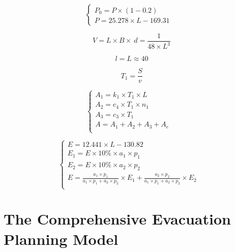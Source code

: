 \documentclass{mcmthesis}
\begin{document}
\begin{equation}
\left\{
\begin{array}{lr}
P_0=P \times (1-0.2) &\\
P=25.278\times L -169.31
\end{array}
\right.
\end{equation}



\begin{equation}\label{3}
V=L\times B\times\ d =\frac{1}{48\times L^3}
\end{equation}

\begin{equation}\label{4}
l=L\approx 40
\end{equation}

\begin{equation}\label{4}
T_1=\frac{S}{v}
\end{equation}


			\begin{equation}
			\left\{
			\begin{array}{lr}

A_1=k_1 \times T_1\times L  &\\
A_2=c_4  \times T_1 \times n_1 &\\
A_3=c_3  \times T_1 &\\
A=A_1+A_2+A_3+A_e \\		
			\end{array}
			\right.
			\end{equation}



\begin{equation}
\left\{
\begin{array}{lr}
E=12.441\times L -130.82&\\
E_1=E \times 10\% \times a_1 \times p_1 &\\
E_2=E\times 10\% \times a_2 \times p_2 &\\
E= \frac{a_1 \times p_1}{a_1 \times p_1+ a_2 \times p_2} \times E_1 + \frac{a_2 \times p_2}{a_1 \times p_1+ a_2 \times p_2} \times E_2\\

\end{array}
\right.
\end{equation}



\section{The Comprehensive Evacuation Planning Model}
\end{document}
